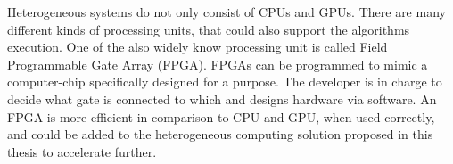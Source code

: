 Heterogeneous systems do not only consist of CPUs and GPUs. There are many different kinds of processing units, that could also support the algorithms execution. One of the also widely know processing unit is called Field Programmable Gate Array (FPGA). FPGAs can be programmed to mimic a computer-chip specifically designed for a purpose. The developer is in charge to decide what gate is connected to which and designs hardware via software. An FPGA is more efficient in comparison to CPU and GPU, when used correctly, \cite{qasaimehComparingEnergyEfficiency2019} and could be added to the heterogeneous computing solution proposed in this thesis to accelerate further.
% 